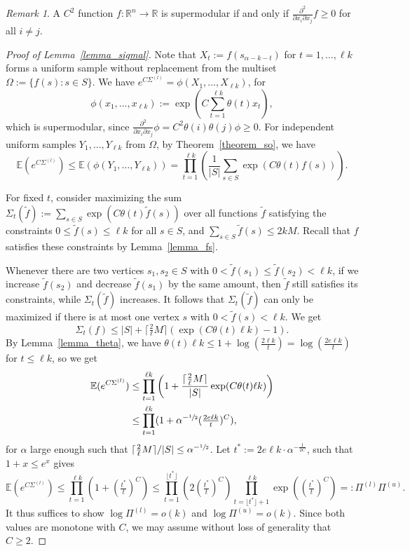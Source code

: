 \documentclass{article}
\theoremstyle{plain}
\theoremstyle{remark}
\newtheorem{remark}[theorem]{Remark}
\theoremstyle{plain}
\numberwithin{equation}{section}
\begin{document}
	\begin{remark}
		A $C^2$ function $f:\mathbb{R}^n\to\mathbb{R}$ is supermodular if and only if $\tfrac{\partial^2}{\partial x_i\partial x_j}f\geq0$ for all $i\neq j$.
	\end{remark}
	
	\begin{proof}[Proof of Lemma~\ref{lemma_sigmal}]
		Note that $X_t:=f(s_{\alpha-k-t})$ for $t=1,\ldots,\ell k$ forms a uniform sample without replacement from the multiset $\Omega:=\{f(s):s\in S\}$. We have $e^{C\Sigma^{(l)}}=\phi(X_1,\ldots,X_{\ell k})$, for $$\phi(x_1,\ldots,x_{\ell k}):=\exp\left(C\sum_{t=1}^{\ell k}\theta(t)x_t\right),$$ which is supermodular, since $\tfrac{\partial^2}{\partial x_i\partial x_j}\phi=C^2\theta(i)\theta(j)\phi\geq0$. For independent uniform samples $Y_1,\ldots,Y_{\ell k}$ from $\Omega$, by Theorem~\ref{theorem_so}, we have $$\mathbb{E}(e^{C\Sigma^{(l)}})\leq\mathbb{E}(\phi(Y_1,\ldots,Y_{\ell k}))=\prod_{t=1}^{\ell k}\left(\frac1{|S|}\sum_{s\in S}\exp(C\theta(t)f(s))\right).$$
		
		For fixed $t$, consider maximizing the sum $\Sigma_t(\widetilde{f}):=\sum_{s\in S}\exp(C\theta(t)\widetilde{f}(s))$ over all functions $\widetilde{f}$ satisfying the constraints $0\leq\widetilde{f}(s)\leq\ell k$ for all $s\in S$, and $\sum_{s\in S}\widetilde{f}(s)\leq 2kM$. Recall that $f$ satisfies these constraints by Lemma~\ref{lemma_fs}.
		
		Whenever there are two vertices $s_1,s_2\in S$ with $0<\widetilde{f}(s_1)\leq\widetilde{f}(s_2)<\ell k$, if we increase $\widetilde{f}(s_2)$ and decrease $\widetilde{f}(s_1)$ by the same amount, then $\widetilde{f}$ still satisfies its constraints, while $\Sigma_t(\widetilde{f})$ increases. It follows that $\Sigma_t(\widetilde{f})$ can only be maximized if there is at most one vertex $s$ with $0<\widetilde{f}(s)<\ell k$. We get $$\Sigma_t(f)\leq|S|+\lceil\tfrac{2}{\ell}M\rceil(\exp(C\theta(t)\ell k)-1).$$ By Lemma~\ref{lemma_theta}, we have $\theta(t)\ell k\leq1+\log(\frac{2\ell k}{t})=\log(\frac{2e\ell k}{t})$ for $t\leq\ell k$, so we get
		\begin{align}
			\mathbb{E}(e^{C\Sigma^{(l)}})
			&\leq\prod_{t=1}^{\ell k}\left(1+\frac{\lceil\frac{2}{\ell}M\rceil}{|S|}\exp(C\theta(t)\ell k)\right)
			\\&\leq\prod_{t=1}^{\ell k}(1+\alpha^{-\sfrac12}(\tfrac{2e\ell k}{t})^{C}),
		\end{align}
		for $\alpha$ large enough such that $\lceil\frac{2}{\ell}M\rceil/|S|\leq\alpha^{-\sfrac12}$. Let $t^*:=2e\ell k\cdot\alpha^{-\frac1{2C}}$, such that $1+x\leq e^x$ gives $$\mathbb{E}(e^{C\Sigma^{(l)}})\leq\prod_{t=1}^{\ell k}(1+(\tfrac{t^*}{t})^{C})\leq\prod_{t=1}^{\lfloor t^*\rfloor}(2(\tfrac{t^*}{t})^{C})\prod_{t=\lfloor t^*\rfloor+1}^{\ell k}\exp((\tfrac{t^*}{t})^{C})=:\Pi^{(l)}\Pi^{(u)}.$$ It thus suffices to show $\log\Pi^{(l)}=o(k)$ and $\log\Pi^{(u)}=o(k)$. Since both values are monotone with $C$, we may assume without loss of generality that $C\geq2$.
		

\end{proof}
\end{document}
